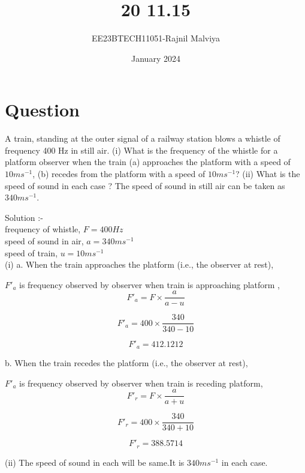 \documentclass[journal,12pt,twocolumn]{IEEEtran}
\theoremstyle{remark}
\begin{document}
\title{20 11.15}
\author{EE23BTECH11051-Rajnil Malviya}
\date{January 2024}



\maketitle

\section*{Question}
A train, standing at the outer signal of a railway station blows a whistle of frequency
400 Hz in still air. (i) What is the frequency of the whistle for a platform observer
when the train (a) approaches the platform with a speed of $10 ms^{-1} $, (b) recedes
from the platform with a speed of $10 ms^{-1} $? (ii) What is the speed of sound in each
case ? The speed of sound in still air can be taken as $340 ms^{-1} $.

\bigskip
Solution :-\\
           frequency of whistle, $F = 400 Hz$\\
speed of sound in air, $a= 340  ms^{-1} $\\
speed of train, $u= 10 ms^{-1} $\\

(i)  a. When the train approaches the platform (i.e., the observer at rest),
\bigskip

$F'_a $ is frequency observed by observer when train is approaching platform ,\\

$$F'_a=F\times\frac{a}{a-u}$$

$$F'_a=400\times\frac{340}{340-10}$$

$$F'_a=412.1212$$
\bigskip

b. When the train recedes the platform (i.e., the observer at rest),
\bigskip

$F'_a $ is frequency observed by observer when train is receding platform,\\
$$F'_r=F\times\frac{a}{a+u}$$

$$F'_r=400\times\frac{340}{340+10}$$

$$F'_r=388.5714$$
\bigskip

(ii) The speed of sound in each will be same.It is $340  ms^{-1}$ in each case.\\
\end{document}
